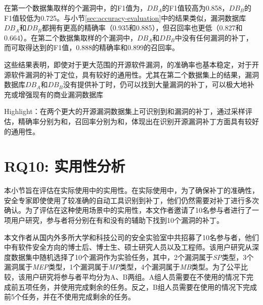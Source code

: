在第一个数据集取样的个漏洞中，\tool 的F1值为，$DB_A$的F1值较高为0.858，$DB_B$的F1值较低为0.725。与小节\ref{sec:accuracy-evaluation}中的结果类似，漏洞数据库$DB_A$和$DB_B$都拥有更高的精确率（0.935和0.885），但召回率也更低（0.827和0.664）。在第二个数据集取样的个漏洞中，$DB_A$和$DB_B$中没有任何漏洞的补丁，而\tool 可取得达到的F1值，0.888的精确率和0.899的召回率。

这些结果表明，即使对于更大范围的开源软件漏洞，\tool 的准确率也基本稳定，对于开源软件漏洞的补丁定位，\tool 具有较好的通用性。尤其在第二个数据集上的结果，漏洞数据库$DB_A$和$DB_B$没有提供补丁时，\tool 仍可以找到大量漏洞的补丁，可以极大地补充或增强现有的商业漏洞数据库


\begin{tcolorbox}[size=title,opacityfill=0.15]
Highlight：\tool 在两个更大的开源漏洞数据集上可识别到和漏洞的补丁，通过采样评估，精确率分别为和，召回率分别为和，体现出\tool 在识别开源漏洞补丁方面具有较好的通用性。
\end{tcolorbox}

\section{RQ10: 实用性分析}\label{sec:usefulness}
本小节旨在评估\tool 在实际使用中的实用性。在实际使用中，为了确保补丁的准确性，安全专家即使使用了较准确的自动工具识别到补丁，他们仍然需要对补丁进行多次确认。为了评估\tool 在这种使用场景中的实用性，本文作者邀请了10名参与者进行了一项用户研究，参与者将分别在有和没有\tool 的辅助下找到10个漏洞的补丁。

本文作者从国内外多所大学和科技公司的安全实验室中共招募了10名参与者，他们中有软件安全方向的博士后、博士生、硕士研究人员以及工程师。该用户研究从深度数据集中随机选择了10个漏洞作为实验任务，其中，2个漏洞属于\textit{SP}类型，3个漏洞属于\textit{MEP}类型，1个漏洞属于\textit{MP}类型，4个漏洞属于\textit{MB}类型。为了公平比较，该用户研究将参与者平均分为A、B两组。A组人员需要在不使用\tool 的情况下完成前五项任务，并使用\tool 完成剩余的任务。反之，B组人员需要在使用\tool 的情况下完成前5个任务，并在不使用\tool 完成剩余的任务。

